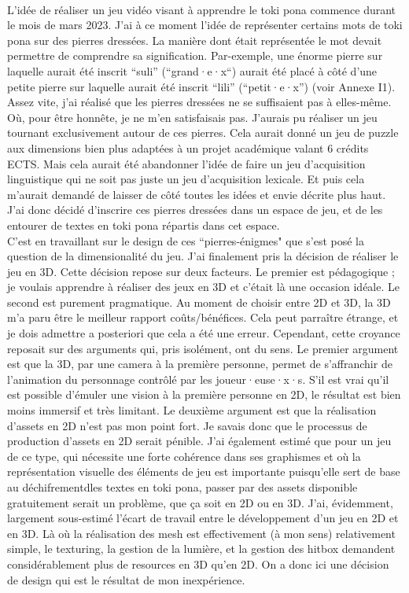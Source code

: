 \documentclass{scrartcl}
\let\emph\relax %
\begin{document}
	\emph{L'île - De l'overscoping au scope creep}\\
	L'idée de réaliser un jeu vidéo visant à apprendre le toki pona commence durant le mois de mars 2023. J'ai à ce moment l'idée de représenter certains mots de toki pona sur des pierres dressées. La manière dont était représentée le mot devait permettre de comprendre sa signification. Par-exemple, une énorme pierre sur laquelle aurait été inscrit “suli” (“grand·e·x“) aurait été placé à côté d'une petite pierre sur laquelle aurait été inscrit “lili” (“petit·e·x”) (voir Annexe I1). Assez vite, j'ai réalisé que les pierres dressées ne se suffisaient pas à elles-même. Où, pour être honnête, je ne m'en satisfaisais pas. J'aurais pu réaliser un jeu tournant exclusivement autour de ces pierres. Cela aurait donné un jeu de puzzle aux dimensions bien plus adaptées à un projet académique valant 6 crédits ECTS. Mais cela aurait été abandonner l'idée de faire un jeu d'acquisition linguistique qui ne soit pas juste un jeu d'acquisition lexicale. Et puis cela m'aurait demandé de laisser de côté toutes les idées et envie décrite plus haut. J'ai donc décidé d'inscrire ces pierres dressées dans un espace de jeu, et de les entourer de textes en toki pona répartis dans cet espace.\\
	C'est en travaillant sur le design de ces “pierres-énigmes" que s'est posé la question de la dimensionalité du jeu. J'ai finalement pris la décision de réaliser le jeu en 3D. Cette décision repose sur deux facteurs. Le premier est pédagogique ; je voulais apprendre à réaliser des jeux en 3D et c'était là une occasion idéale. Le second est purement pragmatique. Au moment de choisir entre 2D et 3D, la 3D m'a paru être le meilleur rapport coûts/bénéfices. Cela peut parraître étrange, et je dois admettre a posteriori que cela a été une erreur. Cependant, cette croyance reposait sur des arguments qui, pris isolément, ont du sens. Le premier argument est que la 3D, par une camera à la première personne, permet de s'affranchir de l'animation du personnage contrôlé par les joueur·euse·x·s. S'il est vrai qu'il est possible d'émuler une vision à la première personne en 2D, le résultat est bien moins immersif et très limitant. Le deuxième argument est que la réalisation d'assets en 2D n'est pas mon point fort. Je savais donc que le processus de production d'assets en 2D serait pénible. J'ai également estimé que pour un jeu de ce type, qui nécessite une forte cohérence dans ses graphismes et où la représentation visuelle des éléments de jeu est importante puisqu'elle sert de base au déchifrementdles textes en toki pona, passer par des assets disponible gratuitement serait un problème, que ça soit en 2D ou en 3D. J'ai, évidemment, largement sous-estimé l'écart de travail entre le développement d'un jeu en 2D et en 3D. Là où la réalisation des mesh est effectivement (à mon sens) relativement simple, le texturing, la gestion de la lumière, et la gestion des hitbox demandent considérablement plus de resources en 3D qu'en 2D. On a donc ici une décision de design qui est le résultat de mon inexpérience.\\
\end{document}
